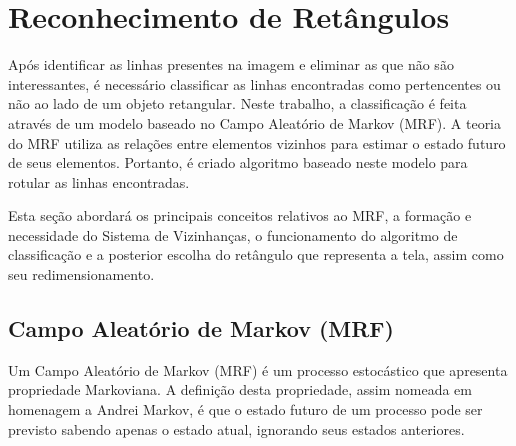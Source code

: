

\section{Reconhecimento de Retângulos} \label{met:retangulo}

Após identificar as linhas presentes na imagem e eliminar as que não são interessantes, é necessário classificar as linhas encontradas como pertencentes ou não ao lado de um objeto retangular. Neste trabalho, a classificação é feita através de um modelo baseado no Campo Aleatório de Markov (MRF). A teoria do MRF utiliza as relações entre elementos vizinhos para estimar o estado futuro de seus elementos. Portanto, é criado algoritmo baseado neste modelo para rotular as linhas encontradas.





Esta seção abordará os principais conceitos relativos ao MRF, a formação e necessidade do Sistema de Vizinhanças, o funcionamento do algoritmo de classificação e a posterior escolha do retângulo que representa a tela, assim como seu redimensionamento.

\subsection{Campo Aleatório de Markov (MRF)}

Um Campo Aleatório de Markov (MRF) é um processo estocástico que apresenta propriedade Markoviana. A definição desta propriedade, assim nomeada em homenagem a Andrei Markov, é que o estado futuro de um processo pode ser previsto sabendo apenas o estado atual, ignorando seus estados anteriores.


